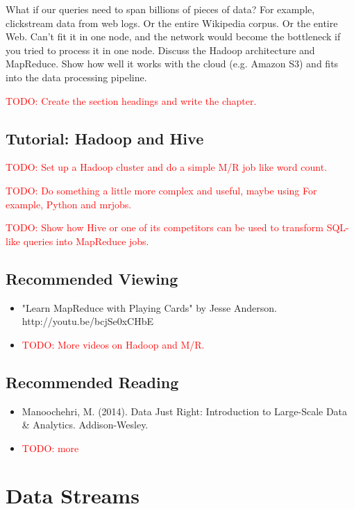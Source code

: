 \documentclass[11pt]{book}
\newcommand{\todo}[1]{\textcolor{red}{TODO: #1}} %
\begin{document}
What if our queries need to span billions of pieces of data?  For example, clickstream data from web logs.  Or the entire Wikipedia corpus.  Or the entire Web.  Can't fit it in one node, and the network would become the bottleneck if you tried to process it in one node.  Discuss the Hadoop architecture and MapReduce.  Show how well it works with the cloud (e.g. Amazon S3) and fits into the data processing pipeline.

\todo{Create the section headings and write the chapter.}

\section*{Tutorial: Hadoop and Hive}

\todo{Set up a Hadoop cluster and do a simple M/R job like word count.}

\todo{Do something a little more complex and useful, maybe using For example, Python and mrjobs.}

\todo{Show how Hive or one of its competitors can be used to transform SQL-like queries into MapReduce jobs.}

\section*{Recommended Viewing}
\begin{itemize}
    \item "Learn MapReduce with Playing Cards" by Jesse Anderson.\\  http://youtu.be/bcjSe0xCHbE
    \item \todo{More videos on Hadoop and M/R.}
\end{itemize}

\section*{Recommended Reading}
\begin{itemize}
    \item Manoochehri, M. (2014). Data Just Right: Introduction to Large-Scale Data \& Analytics. Addison-Wesley.
    \item \todo{more}
\end{itemize}








\chapter{Data Streams}
\end{document}

